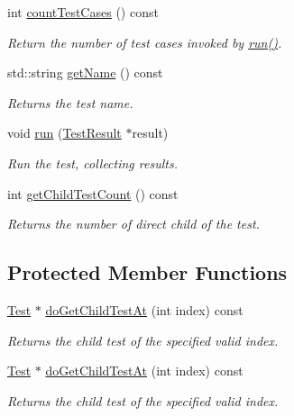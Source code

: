 \begin{DoxyCompactItemize}
\item 
int \hyperlink{class_test_decorator_add3b489dfb3331eba0aee7e06b03548b}{count\+Test\+Cases} () const 
\begin{DoxyCompactList}\small\item\em Return the number of test cases invoked by \hyperlink{class_test_decorator_a64dd70aae76f31f2e2f7b5ac84a8e829}{run()}. \end{DoxyCompactList}\item 
std\+::string \hyperlink{class_test_decorator_acdcf679bba926032d2e4535fca1e9cf0}{get\+Name} () const 
\begin{DoxyCompactList}\small\item\em Returns the test name. \end{DoxyCompactList}\item 
\hypertarget{class_test_decorator_a64dd70aae76f31f2e2f7b5ac84a8e829}{void \hyperlink{class_test_decorator_a64dd70aae76f31f2e2f7b5ac84a8e829}{run} (\hyperlink{class_test_result}{Test\+Result} $\ast$result)}\label{class_test_decorator_a64dd70aae76f31f2e2f7b5ac84a8e829}

\begin{DoxyCompactList}\small\item\em Run the test, collecting results. \end{DoxyCompactList}\item 
\hypertarget{class_test_decorator_aa2fbf0467c6bd599f912415a097e087c}{int \hyperlink{class_test_decorator_aa2fbf0467c6bd599f912415a097e087c}{get\+Child\+Test\+Count} () const }\label{class_test_decorator_aa2fbf0467c6bd599f912415a097e087c}

\begin{DoxyCompactList}\small\item\em Returns the number of direct child of the test. \end{DoxyCompactList}\end{DoxyCompactItemize}
\subsection*{Protected Member Functions}
\begin{DoxyCompactItemize}
\item 
\hyperlink{class_test}{Test} $\ast$ \hyperlink{class_test_decorator_a6a00721e39bb7e7ce5356e9a10584275}{do\+Get\+Child\+Test\+At} (int index) const 
\begin{DoxyCompactList}\small\item\em Returns the child test of the specified valid index. \end{DoxyCompactList}\item 
\hyperlink{class_test}{Test} $\ast$ \hyperlink{class_test_decorator_a029da80376365525d52387a88e6837f4}{do\+Get\+Child\+Test\+At} (int index) const 
\begin{DoxyCompactList}\small\item\em Returns the child test of the specified valid index. \end{DoxyCompactList}\end{DoxyCompactItemize}
